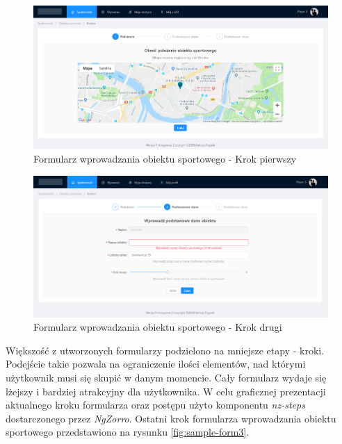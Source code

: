 \begin{figure}[H]
\centering
\includegraphics[width=\linewidth]{06-implementacja/rys/form1.PNG}
\caption{Formularz wprowadzania obiektu sportowego - Krok pierwszy}
\label{fig:sample-form1}
\end{figure}



\begin{figure}[H]
\centering
\includegraphics[width=\linewidth]{06-implementacja/rys/form2.PNG}
\caption{Formularz wprowadzania obiektu sportowego - Krok drugi}
\label{fig:sample-form2}
\end{figure}


Większość z utworzonych formularzy podzielono na mniejsze etapy - kroki. Podejście takie pozwala na ograniczenie ilości elementów, nad którymi użytkownik musi się skupić w danym momencie. Cały formularz wydaje się lżejszy i bardziej atrakcyjny dla użytkownika. W celu graficznej prezentacji aktualnego kroku formularza oraz postępu użyto komponentu \textit{nz-steps} dostarczonego przez \textit{NgZorro}. Ostatni krok formularza wprowadzania obiektu sportowego przedstawiono na rysunku \ref{fig:sample-form3}.

